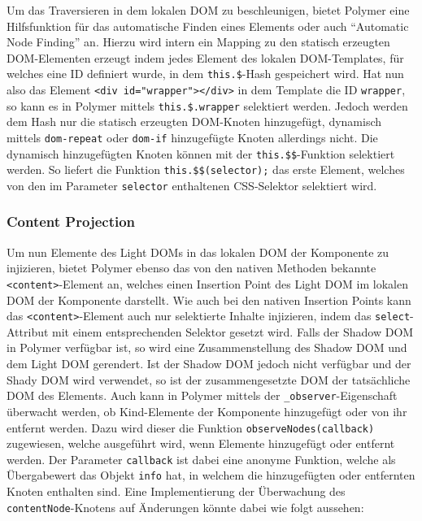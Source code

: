 \documentclass[]{article}
\begin{document}
Um das Traversieren in dem lokalen DOM zu beschleunigen, bietet Polymer
eine Hilfsfunktion für das automatische Finden eines Elements oder auch
``Automatic Node Finding'' an. Hierzu wird intern ein Mapping zu den
statisch erzeugten DOM-Elementen erzeugt indem jedes Element des lokalen
DOM-Templates, für welches eine ID definiert wurde, in dem
\texttt{this.\$}-Hash gespeichert wird. Hat nun also das Element
\texttt{\textless{}div\ id="wrapper"\textgreater{}\textless{}/div\textgreater{}}
in dem Template die ID \texttt{wrapper}, so kann es in Polymer mittels
\texttt{this.\$.wrapper} selektiert werden. Jedoch werden dem Hash nur
die statisch erzeugten DOM-Knoten hinzugefügt, dynamisch mittels
\texttt{dom-repeat} oder \texttt{dom-if} hinzugefügte Knoten allerdings
nicht. Die dynamisch hinzugefügten Knoten können mit der
\texttt{this.\$\$}-Funktion selektiert werden. So liefert die Funktion
\texttt{this.\$\$(selector);} das erste Element, welches von den im
Parameter \texttt{selector} enthaltenen CSS-Selektor selektiert wird.

\subsubsection{Content Projection}\label{content-projection}

Um nun Elemente des Light DOMs in das lokalen DOM der Komponente zu
injizieren, bietet Polymer ebenso das von den nativen Methoden bekannte
\texttt{\textless{}content\textgreater{}}-Element an, welches einen
Insertion Point des Light DOM im lokalen DOM der Komponente darstellt.
Wie auch bei den nativen Insertion Points kann das
\texttt{\textless{}content\textgreater{}}-Element auch nur selektierte
Inhalte injizieren, indem das \texttt{select}-Attribut mit einem
entsprechenden Selektor gesetzt wird. Falls der Shadow DOM in Polymer
verfügbar ist, so wird eine Zusammenstellung des Shadow DOM und dem
Light DOM gerendert. Ist der Shadow DOM jedoch nicht verfügbar und der
Shady DOM wird verwendet, so ist der zusammengesetzte DOM der
tatsächliche DOM des Elements. Auch kann in Polymer mittels der
\texttt{\_observer}-Eigenschaft überwacht werden, ob Kind-Elemente der
Komponente hinzugefügt oder von ihr entfernt werden. Dazu wird dieser
die Funktion \texttt{observeNodes(callback)} zugewiesen, welche
ausgeführt wird, wenn Elemente hinzugefügt oder entfernt werden. Der
Parameter \texttt{callback} ist dabei eine anonyme Funktion, welche als
Übergabewert das Objekt \texttt{info} hat, in welchem die hinzugefügten
oder entfernten Knoten enthalten sind. Eine Implementierung der
Überwachung des \texttt{contentNode}-Knotens auf Änderungen könnte dabei
wie folgt aussehen:
\end{document}
